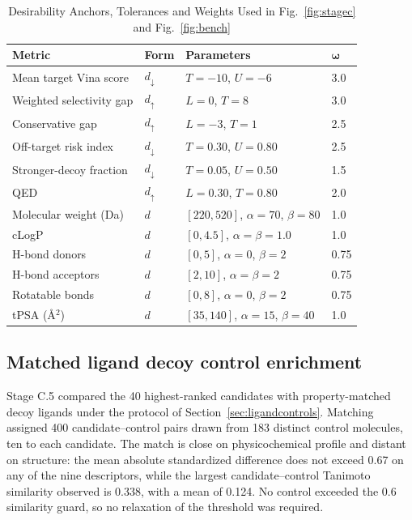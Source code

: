 \documentclass[journal]{IEEEtran}
\begin{document}
\begin{table}[!htbp]
\caption{Desirability Anchors, Tolerances and Weights Used in
Fig.~\ref{fig:stagec} and Fig.~\ref{fig:bench}}
\label{tab:desir}
\centering
\footnotesize
\setlength{\tabcolsep}{3.5pt}
\renewcommand{\arraystretch}{1.2}
\begin{tabular}{@{}llll@{}}
\toprule
\textbf{Metric} & \textbf{Form} & \textbf{Parameters} &
$\bm{\omega}$\\
\midrule
Mean target Vina score      & $d_{\downarrow}$ & $T=-10$, $U=-6$ & 3.0\\
Weighted selectivity gap    & $d_{\uparrow}$   & $L=0$, $T=8$    & 3.0\\
Conservative gap            & $d_{\uparrow}$   & $L=-3$, $T=1$   & 2.5\\
Off-target risk index       & $d_{\downarrow}$ & $T=0.30$, $U=0.80$ & 2.5\\
Stronger-decoy fraction     & $d_{\downarrow}$ & $T=0.05$, $U=0.50$ & 1.5\\
QED                         & $d_{\uparrow}$   & $L=0.30$, $T=0.80$ & 2.0\\
Molecular weight (Da)       & $d$ & $[220,520]$, $\alpha=70$, $\beta=80$ & 1.0\\
cLogP                       & $d$ & $[0,4.5]$, $\alpha=\beta=1.0$ & 1.0\\
H-bond donors               & $d$ & $[0,5]$, $\alpha=0$, $\beta=2$ & 0.75\\
H-bond acceptors            & $d$ & $[2,10]$, $\alpha=\beta=2$ & 0.75\\
Rotatable bonds             & $d$ & $[0,8]$, $\alpha=0$, $\beta=2$ & 0.75\\
tPSA (\AA$^2$)              & $d$ & $[35,140]$, $\alpha=15$, $\beta=40$ & 1.0\\
\bottomrule
\end{tabular}
\end{table}

\subsection{Matched ligand decoy control enrichment}
\label{sec:res-ligand}

Stage C.5 compared the 40 highest-ranked candidates with
property-matched decoy ligands under the protocol of
Section~\ref{sec:ligandcontrols}. Matching assigned 400
candidate--control pairs drawn from 183 distinct control molecules, ten
to each candidate. The match is close on physicochemical profile and
distant on structure: the mean absolute standardized difference does
not exceed 0.67 on any of the nine descriptors, while the largest
candidate--control Tanimoto similarity observed is 0.338, with a mean
of 0.124. No control exceeded the 0.6 similarity guard, so no
relaxation of the threshold was required.
\end{document}
